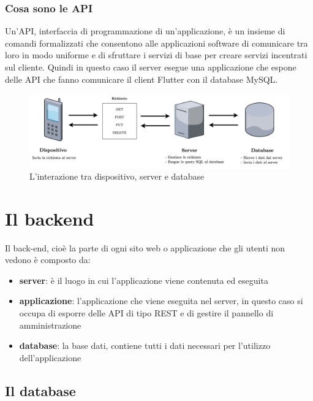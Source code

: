 \documentclass[12pt]{article}
\begin{document}
\subsubsection{Cosa sono le API}
Un'API, interfaccia di programmazione di un’applicazione, è un insieme di comandi formalizzati che consentono alle applicazioni software di comunicare tra loro in modo uniforme e di sfruttare i servizi di base per creare servizi incentrati sul cliente. Quindi in questo caso il server esegue una applicazione che espone delle API che fanno comunicare il client Flutter con il database MySQL. 

\begin{center}
\begin{figure}[htp]
    \centering
    \includegraphics[width=12cm]{diagrams/diagramma_backend.png}
    \caption{L'interazione tra dispositivo, server e database}
    \label{fig:interazione_backend}
\end{figure}
\end{center}


\clearpage
\section{Il backend}
Il back-end, cioè la parte di ogni sito web o applicazione che gli utenti non vedono è composto da:
\begin{itemize}
    \item \textbf{server}: è il luogo in cui l'applicazione viene contenuta ed eseguita
    \item \textbf{applicazione}: l'applicazione che viene eseguita nel server, in questo caso si occupa di esporre delle API di tipo REST e di gestire il pannello di amministrazione
    \item \textbf{database}: la base dati, contiene tutti i dati necessari per l'utilizzo dell'applicazione  
\end{itemize}

\subsection{Il database}
\end{document}
